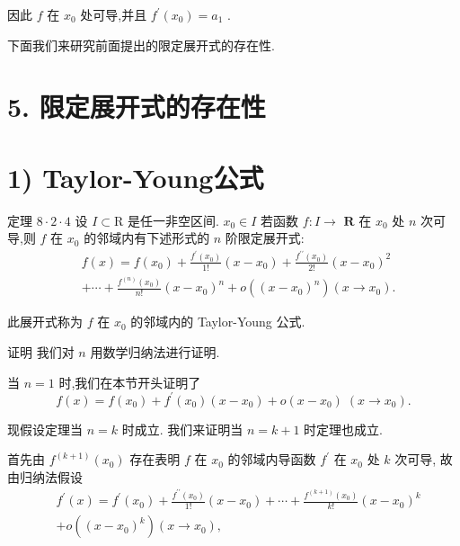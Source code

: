 因此 $f$ 在 ${x}_{0}$ 处可导,并且 ${f}^{\prime }\left( {x}_{0}\right)  = {a}_{1}$ .

下面我们来研究前面提出的限定展开式的存在性.

\section*{5. 限定展开式的存在性}

\section*{1) Taylor-Young公式}

定理 $8 \cdot  2 \cdot  4$ 设 $I \subset  \mathrm{R}$ 是任一非空区间. ${x}_{0} \in  I$ 若函数 $f : I \rightarrow$  $\mathbf{R}$ 在 ${x}_{0}$ 处 $n$ 次可导,则 $f$ 在 ${x}_{0}$ 的邻域内有下述形式的 $n$ 阶限定展开式:
\begin{align*}
	&f\left( x\right)  = f\left( {x}_{0}\right)  + \frac{{f}^{\prime }\left( {x}_{0}\right) }{1!}\left( {x - {x}_{0}}\right)  + \frac{{f}^{\prime \prime }\left( {x}_{0}\right) }{2!}{\left( x - {x}_{0}\right) }^{2}\\
	&+ \cdots  + \frac{{f}^{\left( n\right) }\left( {x}_{0}\right) }{n!}{\left( x - {x}_{0}\right) }^{n} + o\left( {\left( x - {x}_{0}\right) }^{n}\right) \left( {x \rightarrow  {x}_{0}}\right) .
\end{align*}

此展开式称为 $f$ 在 ${x}_{0}$ 的邻域内的 Taylor-Young 公式.

证明 我们对 $n$ 用数学归纳法进行证明.

当 $n = 1$ 时,我们在本节开头证明了
$$f\left( x\right)  = f\left( {x}_{0}\right)  + {f}^{\prime }\left( {x}_{0}\right) \left( {x - {x}_{0}}\right)  + o\left( {x - {x}_{0}}\right) \;\left( {x \rightarrow  {x}_{0}}\right) .$$

现假设定理当 $n = k$ 时成立. 我们来证明当 $n = k + 1$ 时定理也成立.

首先由 ${f}^{\left( k + 1\right) }\left( {x}_{0}\right)$ 存在表明 $f$ 在 ${x}_{0}$ 的邻域内导函数 ${f}^{\prime }$ 在 ${x}_{0}$ 处 $k$ 次可导, 故由归纳法假设
\begin{align*}
	&{f}^{\prime }\left( x\right)  = {f}^{\prime }\left( {x}_{0}\right)  + \frac{{f}^{\prime \prime }\left( {x}_{0}\right) }{1!}\left( {x - {x}_{0}}\right)  + \cdots  + \frac{{f}^{\left( k + 1\right) }\left( {x}_{0}\right) }{k!}{\left( x - {x}_{0}\right) }^{k}\\
	&+ o\left( {\left( x - {x}_{0}\right) }^{k}\right) \left( {x \rightarrow  {x}_{0}}\right) ,
\end{align*}

